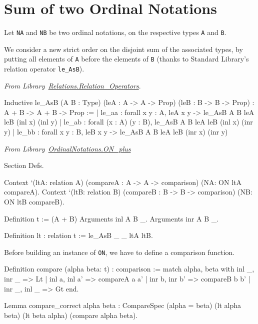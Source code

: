 \section{Sum of  two Ordinal Notations}

Let \texttt{NA} and \texttt{NB} be two ordinal notations, on the respective types \texttt{A} and \texttt{B}.

 We consider a new strict order
on the disjoint sum of the associated types, by putting all elements of \texttt{A} before the elements of \texttt{B} (thanks to Standard Library's relation operator \texttt{le\_AsB}).

\vspace{4pt}
\noindent
\emph{From Library~\href{https://coq.inria.fr/distrib/current/stdlib/Coq.Relations.Relation_Operators.html}{Relations.Relation\_Operators}}.

\begin{Coqanswer}
Inductive
le_AsB (A B : Type) (leA : A -> A -> Prop) (leB : B -> B -> Prop)
  : A + B -> A + B -> Prop :=
| le_aa : forall x y : A, leA x y -> le_AsB A B leA leB (inl x) (inl y)
| le_ab : forall (x : A) (y : B), le_AsB A B leA leB (inl x) (inr y)
| le_bb : forall x y : B, leB x y -> le_AsB A B leA leB (inr x) (inr y)
\end{Coqanswer}


\vspace{4pt}
\noindent\emph{From Library~\href{../theories/html/hydras.OrdinalNotations/ON_plus.html}{OrdinalNotations.ON\_plus}}


\begin{Coqsrc}
Section Defs.

  Context `(ltA: relation A)
          (compareA : A -> A -> comparison)
          (NA: ON ltA compareA).
  Context `(ltB: relation B)
          (compareB : B -> B -> comparison)
          (NB: ON ltB compareB).


Definition t := (A + B)%
Arguments inl  {A B} _.
Arguments inr  {A B} _.

Definition lt : relation t := le_AsB _ _ ltA ltB.
\end{Coqsrc}

Before building an instance of \texttt{ON}, we have to define a comparison function.


\begin{Coqsrc}
Definition compare (alpha beta: t) : comparison :=
   match alpha, beta with
     inl _, inr _ => Lt
   | inl a, inl a' => compareA a a'
   | inr b, inr b' => compareB b b'
   | inr _, inl _ => Gt
  end.

Lemma compare_correct alpha beta :
    CompareSpec (alpha = beta) (lt alpha beta) (lt beta alpha)
                            (compare alpha beta).
\end{Coqsrc}

